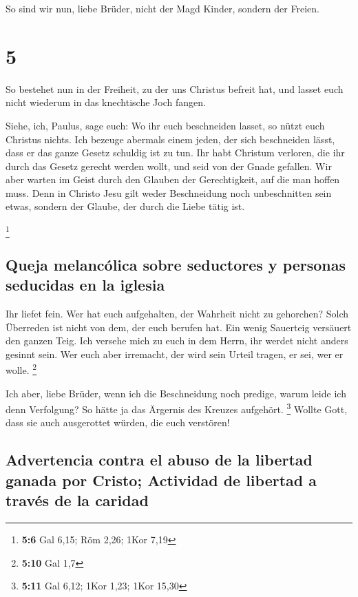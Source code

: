  So sind wir nun, liebe Brüder, nicht der Magd Kinder,
sondern der Freien.

\hypertarget{section-4}{%
\section{5}\label{section-4}}

 So bestehet nun in der Freiheit, zu der uns Christus
befreit hat, und lasset euch nicht wiederum in das knechtische Joch
fangen.

 Siehe, ich, Paulus, sage euch: Wo ihr euch beschneiden
lasset, so nützt euch Christus nichts.  Ich bezeuge
abermals einem jeden, der sich beschneiden lässt, dass er das ganze
Gesetz schuldig ist zu tun.  Ihr habt Christum verloren,
die ihr durch das Gesetz gerecht werden wollt, und seid von der Gnade
gefallen.  Wir aber warten im Geist durch den Glauben der
Gerechtigkeit, auf die man hoffen muss.  Denn in Christo
Jesu gilt weder Beschneidung noch unbeschnitten sein etwas, sondern der
Glaube, der durch die Liebe tätig ist.

\footnote{\textbf{5:6} Gal 6,15; Röm 2,26; 1Kor 7,19}

\hypertarget{queja-melancuxf3lica-sobre-seductores-y-personas-seducidas-en-la-iglesia}{%
\subsection{Queja melancólica sobre seductores y personas seducidas en
la
iglesia}\label{queja-melancuxf3lica-sobre-seductores-y-personas-seducidas-en-la-iglesia}}

 Ihr liefet fein. Wer hat euch aufgehalten, der Wahrheit
nicht zu gehorchen?  Solch Überreden ist nicht von dem,
der euch berufen hat.  Ein wenig Sauerteig versäuert den
ganzen Teig.  Ich versehe mich zu euch in dem Herrn, ihr
werdet nicht anders gesinnt sein. Wer euch aber irremacht, der wird sein
Urteil tragen, er sei, wer er wolle. \footnote{\textbf{5:10} Gal 1,7}

 Ich aber, liebe Brüder, wenn ich die Beschneidung noch
predige, warum leide ich denn Verfolgung? So hätte ja das Ärgernis des
Kreuzes aufgehört. \footnote{\textbf{5:11} Gal 6,12; 1Kor 1,23; 1Kor
  15,30}  Wollte Gott, dass sie auch ausgerottet würden,
die euch verstören!

\hypertarget{advertencia-contra-el-abuso-de-la-libertad-ganada-por-cristo-actividad-de-libertad-a-travuxe9s-de-la-caridad}{%
\subsection{Advertencia contra el abuso de la libertad ganada por
Cristo; Actividad de libertad a través de la
caridad}\label{advertencia-contra-el-abuso-de-la-libertad-ganada-por-cristo-actividad-de-libertad-a-travuxe9s-de-la-caridad}}

